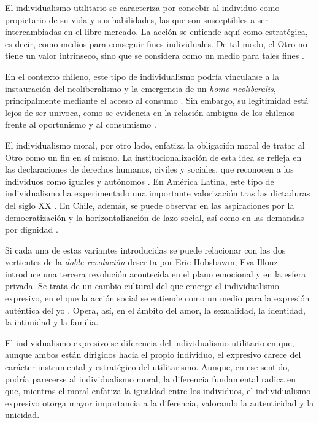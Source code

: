\documentclass[12pt,twoside]{templates/facsothesis}
\begin{document}
El individualismo utilitario se caracteriza por concebir al individuo como propietario de su vida y sus habilidades, las que son susceptibles a ser intercambiadas en el libre mercado. La acción se entiende aquí como estratégica, es decir, como medios para conseguir fines individuales. De tal modo, el Otro no tiene un valor intrínseco, sino que se considera como un medio para tales fines \citep{cortois2018}.

En el contexto chileno, este tipo de individualismo podría vincularse a la instauración del neoliberalismo y la emergencia de un \emph{homo neoliberalis}, principalmente mediante el acceso al consumo \citep{araujo2012, araujo2020a}. Sin embargo, su legitimidad está lejos de ser univoca, como se evidencia en la relación ambigua de los chilenos frente al oportunismo \citep{araujo2014} y al consumismo \citep{araujo2012}.

El individualismo moral, por otro lado, enfatiza la obligación moral de tratar al Otro como un fin en sí mismo. La institucionalización de esta idea se refleja en las declaraciones de derechos humanos, civiles y sociales, que reconocen a los individuos como iguales y autónomos \citep{cortois2018}. En América Latina, este tipo de individualismo ha experimentado una importante valorización tras las dictaduras del siglo XX \citep{araujo2020a}. En Chile, además, se puede observar en las aspiraciones por la democratización y la horizontalización de lazo social, así como en las demandas por dignidad \citep{araujo2012}.

Si cada una de estas variantes introducidas se puede relacionar con las dos vertientes de la \emph{doble revolución} descrita por Eric Hobsbawm, Eva Illouz \citeyearpar{illouz2020} introduce una tercera revolución acontecida en el plano emocional y en la esfera privada. Se trata de un cambio cultural del que emerge el individualismo expresivo, en el que la acción social se entiende como un medio para la expresión auténtica del yo \citep{cortois2018}. Opera, así, en el ámbito del amor, la sexualidad, la identidad, la intimidad y la familia.

El individualismo expresivo se diferencia del individualismo utilitario en que, aunque ambos están dirigidos hacia el propio individuo, el expresivo carece del carácter instrumental y estratégico del utilitarismo. Aunque, en ese sentido, podría parecerse al individualismo moral, la diferencia fundamental radica en que, mientras el moral enfatiza la igualdad entre los individuos, el individualismo expresivo otorga mayor importancia a la diferencia, valorando la autenticidad y la unicidad.
\end{document}
